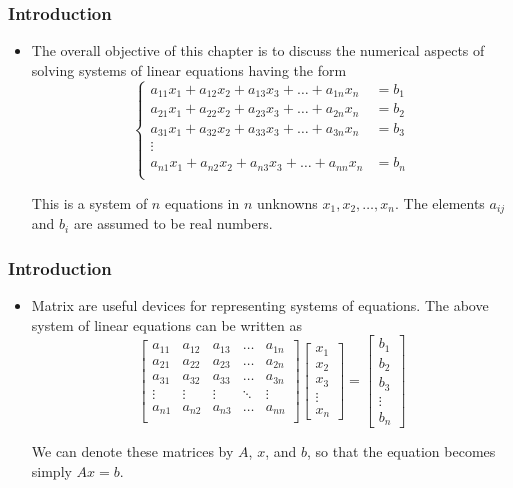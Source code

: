 \documentclass[notheorems,mathserif,table,compress]{beamer}  %
\begin{document}
\begin{frame}
\frametitle{Introduction}
\begin{itemize}
\item The overall objective of this chapter is to discuss the numerical aspects of solving systems of linear equations having the form
\begin{equation*}
\left\{ \begin{aligned}
a_{11}x_1+a_{12}x_2+a_{13}x_3+\ldots+a_{1n}x_n&=b_1 \\
a_{21}x_1+a_{22}x_2+a_{23}x_3+\ldots+a_{2n}x_n&=b_2 \\
a_{31}x_1+a_{32}x_2+a_{33}x_3+\ldots+a_{3n}x_n&=b_3 \\
\vdots \\
a_{n1}x_1+a_{n2}x_2+a_{n3}x_3+\ldots+a_{nn}x_n&=b_n \\
\end{aligned} \right.
\end{equation*}

This is a system of $n$ equations in $n$ unknowns $x_1,x_2,\ldots,x_n$. The elements $a_{ij}$ and $b_i$ are assumed to be real numbers.
\end{itemize}
\end{frame}

\begin{frame}
\frametitle{Introduction}
\begin{itemize}
\item Matrix are useful devices for representing systems of equations. The above system of linear equations can be written as
\begin{displaymath}
\begin{bmatrix}
a_{11} & a_{12} & a_{13} & \ldots & a_{1n}\\
a_{21} & a_{22} & a_{23} & \ldots & a_{2n}\\
a_{31} & a_{32} & a_{33} & \ldots & a_{3n}\\
\vdots & \vdots & \vdots & \ddots & \vdots \\
a_{n1} & a_{n2} & a_{n3} & \ldots & a_{nn}\\
\end{bmatrix}
\begin{bmatrix}
x_1\\
x_2\\
x_3\\
\vdots\\
x_n
\end{bmatrix}
=\begin{bmatrix}
b_1\\
b_2\\
b_3\\
\vdots\\
b_n
\end{bmatrix}
\end{displaymath}

We can denote these matrices by $A$, $x$, and $b$, so that the equation becomes simply $Ax=b$.
\end{itemize}
\end{frame}
\end{document}
